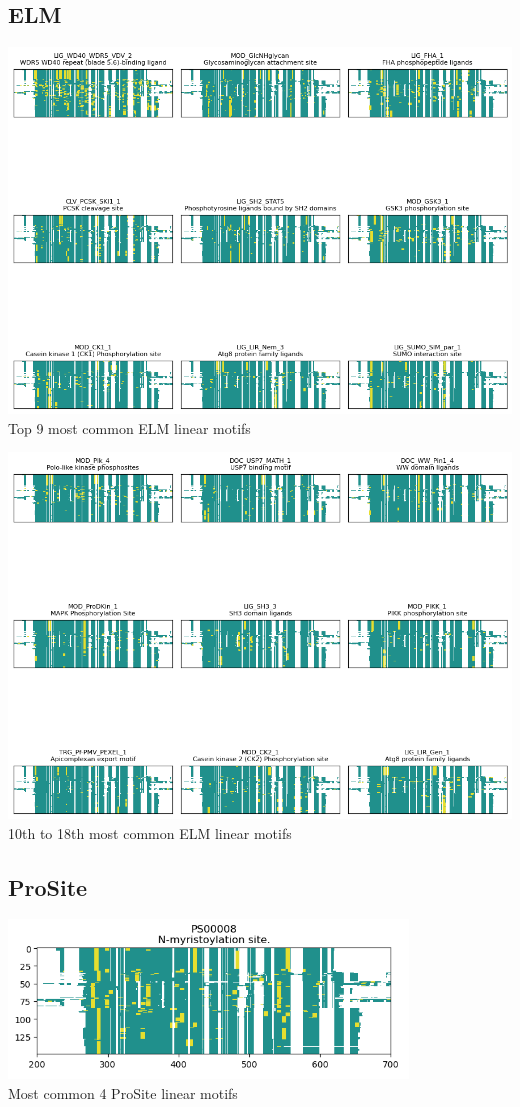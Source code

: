 \documentclass[10pt,twocolumn,letterpaper]{article}
\begin{document}
\subsection{ELM}
\label{sec:elm_motifs}
\begin{center}
    \includegraphics[scale=0.8]{report/img/Elm1.png} \\
    \small{Top 9 most common ELM linear motifs}
\end{center}
\begin{center}
    \includegraphics[scale=0.8]{report/img/Elm2.png} \\
    \small{10th to 18th most common ELM linear motifs}
\end{center}

\subsection{ProSite}
\begin{center}
    \includegraphics[scale=0.80]{report/img/Prosite.png} \\
    \small{Most common 4 ProSite linear motifs}
\end{center}
\end{document}

